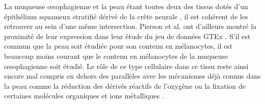 La muqueuse œsophagienne et la peau étant toutes deux des tissus dotés d'un épithélium squameux stratifié dérivé de la crête neurale , il est cohérent de les retrouver au sein d'une même intersection. Pierson et al. ont d'ailleurs montré la proximité de leur expression dans leur étude du jeu de données GTEx . S'il est commun que la peau soit étudiée pour son contenu en mélanocytes, il est beaucoup moins courant que le contenu en mélanocytes de la muqueuse œsophagienne soit étudié. Le rôle de ce type cellulaire dans ce tissu reste ainsi encore mal compris en dehors des parallèles avec les mécanismes déjà connus dans la peau comme la réduction des dérivés réactifs de l'oxygène ou la fixation de certaines molécules organiques et ions métalliques . 


